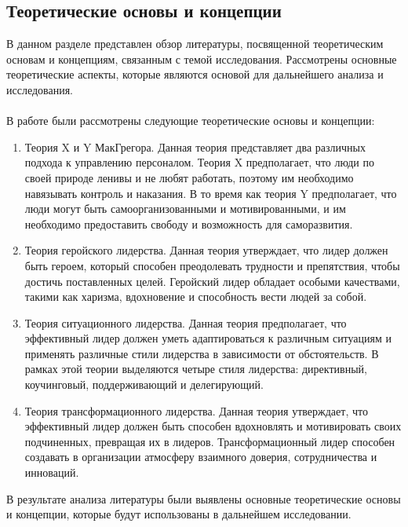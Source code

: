 \documentclass{article}
\begin{document}
\subsection{Теоретические основы и концепции}
В данном разделе представлен обзор литературы, посвященной теоретическим основам и концепциям, связанным с темой исследования. Рассмотрены основные теоретические аспекты, которые являются основой для дальнейшего анализа и исследования.\\
~\\
В работе были рассмотрены следующие теоретические основы и концепции:
\begin{enumerate}
\item Теория X и Y МакГрегора. Данная теория представляет два различных подхода к управлению персоналом. Теория X предполагает, что люди по своей природе ленивы и не любят работать, поэтому им необходимо навязывать контроль и наказания. В то время как теория Y предполагает, что люди могут быть самоорганизованными и мотивированными, и им необходимо предоставить свободу и возможность для саморазвития.
\item Теория геройского лидерства. Данная теория утверждает, что лидер должен быть героем, который способен преодолевать трудности и препятствия, чтобы достичь поставленных целей. Геройский лидер обладает особыми качествами, такими как харизма, вдохновение и способность вести людей за собой.
\item Теория ситуационного лидерства. Данная теория предполагает, что эффективный лидер должен уметь адаптироваться к различным ситуациям и применять различные стили лидерства в зависимости от обстоятельств. В рамках этой теории выделяются четыре стиля лидерства: директивный, коучинговый, поддерживающий и делегирующий.
\item Теория трансформационного лидерства. Данная теория утверждает, что эффективный лидер должен быть способен вдохновлять и мотивировать своих подчиненных, превращая их в лидеров. Трансформационный лидер способен создавать в организации атмосферу взаимного доверия, сотрудничества и инноваций.
\end{enumerate}
В результате анализа литературы были выявлены основные теоретические основы и концепции, которые будут использованы в дальнейшем исследовании.\\
~\\

\newpage
\end{document}
